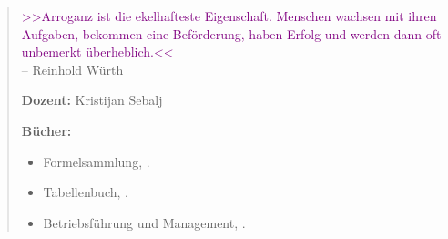 \null\vfil
\begin{otherlanguage}{ngerman}
\begin{center}\textsf{\textbf{\abstractname}}\end{center}


    \begin{quote}
        \textcolor{purple}{>>Arroganz ist die ekelhafteste Eigenschaft. 
        Menschen wachsen mit ihren Aufgaben, bekommen eine Beförderung, 
        haben Erfolg und werden dann oft unbemerkt überheblich.<<}\\ 
        \raggedleft \small{-- Reinhold Würth}%
        
        \raggedright
        \textbf{Dozent:} Kristijan Sebalj

        \textbf{Bücher:}

        \begin{itemize}      
            \item Formelsammlung, \textcite{bell:2020:formelsammlung}.
            \item Tabellenbuch, \textcite{bell:2021:tabellenbuchKfz}.
            \item Betriebsführung und Management, \textcite{heiser:2017:betriebsfuhrung}.
        \end{itemize}


    \end{quote}

\end{otherlanguage}
\vfil\null



